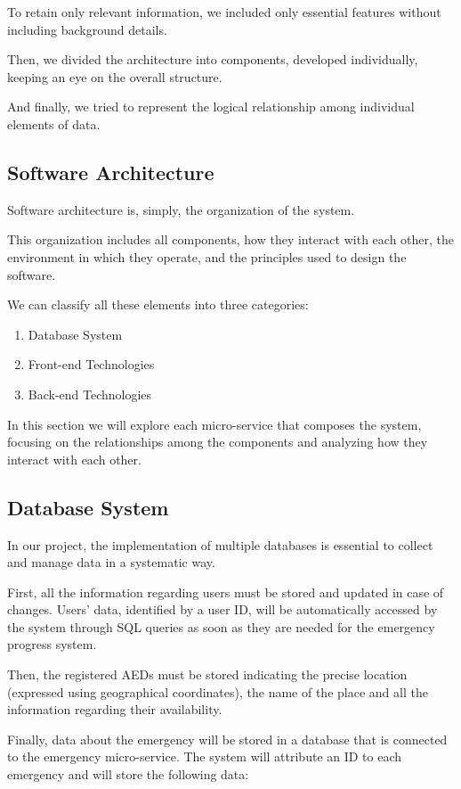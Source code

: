 \documentclass[11pt,a4paper]{article}
\begin{document}
To retain only relevant information, we included only essential features without including background details.

Then, we divided the architecture into components, developed individually, keeping an eye on the overall structure.

And finally, we tried to represent the logical relationship among individual elements of data.

\subsection{Software Architecture}
Software architecture is, simply, the organization of the system. 

This organization includes all components, how they interact with each other, the environment in which they operate, and the principles used to design the software.

We can classify all these elements into three categories:

\begin{enumerate}
    \item Database System
    \item Front-end Technologies
    \item Back-end Technologies
\end{enumerate}

In this section we will explore each micro-service that composes the system, focusing on the relationships among the components and analyzing how they interact with each other.

\subsection{Database System}
In our project, the implementation of multiple databases is essential to collect and manage data in a systematic way.

First, all the information regarding users must be stored and updated in case of changes. 
%
Users' data, identified by a user ID, will be automatically accessed by the system through SQL queries as soon as they are needed for the emergency progress system. 

Then, the registered AEDs must be stored indicating the precise location (expressed using geographical coordinates), the name of the place and all the information regarding their availability.

Finally, data about the emergency will be stored in a database that is connected to the emergency micro-service.
%
The system will attribute an ID to each emergency and will store the following data:
\end{document}
